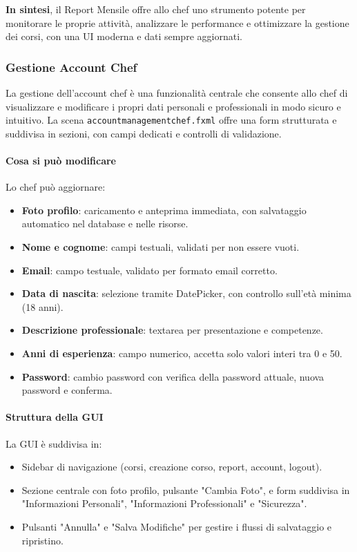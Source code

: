 \textbf{In sintesi}, il Report Mensile offre allo chef uno strumento potente per monitorare le proprie attività, analizzare le performance e ottimizzare la gestione dei corsi, con una UI moderna e dati sempre aggiornati.


\subsubsection{Gestione Account Chef}
La gestione dell'account chef è una funzionalità centrale che consente allo chef di visualizzare e modificare i propri dati personali e professionali in modo sicuro e intuitivo. La scena \texttt{accountmanagementchef.fxml} offre una form strutturata e suddivisa in sezioni, con campi dedicati e controlli di validazione.

\paragraph{Cosa si può modificare}
Lo chef può aggiornare:
\begin{itemize}
    \item \textbf{Foto profilo}: caricamento e anteprima immediata, con salvataggio automatico nel database e nelle risorse.
    \item \textbf{Nome e cognome}: campi testuali, validati per non essere vuoti.
    \item \textbf{Email}: campo testuale, validato per formato email corretto.
    \item \textbf{Data di nascita}: selezione tramite DatePicker, con controllo sull'età minima (18 anni).
    \item \textbf{Descrizione professionale}: textarea per presentazione e competenze.
    \item \textbf{Anni di esperienza}: campo numerico, accetta solo valori interi tra 0 e 50.
    \item \textbf{Password}: cambio password con verifica della password attuale, nuova password e conferma.
\end{itemize}

\paragraph{Struttura della GUI}
La GUI è suddivisa in:
\begin{itemize}
    \item Sidebar di navigazione (corsi, creazione corso, report, account, logout).
    \item Sezione centrale con foto profilo, pulsante "Cambia Foto", e form suddivisa in "Informazioni Personali", "Informazioni Professionali" e "Sicurezza".
    \item Pulsanti "Annulla" e "Salva Modifiche" per gestire i flussi di salvataggio e ripristino.
\end{itemize}

